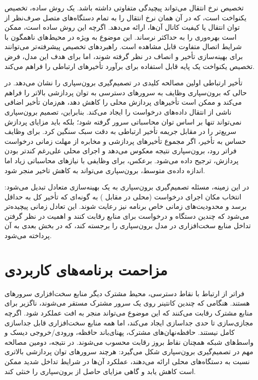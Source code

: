 تخصیص نرخ انتقال می‌تواند پیچیدگی متفاوتی داشته باشد. یک روش ساده، تخصیص یکنواخت است، که در آن  همان نرخ انتقال را به تمام دستگاه‌های متصل صرف‌نظر از توان انتقال یا کیفیت کانال آن‌ها، ارائه می‌دهد. اگرچه این روش ساده است، ممکن است بهره‌وری را به حداکثر نرساند. این موضوع به ویژه در محیط‌های ناهمگون با شرایط اتصال متفاوت قابل مشاهده است. راهبردهای تخصیص پیشرفته‌تر می‌توانند برای بهینه‌سازی تأخیر و انصاف در نظر گرفته شوند، اما برای هدف این مدل، فرض تخصیص یکنواخت یک پایه قابل استفاده برای برآورد تأخیرهای ارتباطی را فراهم می‌کند.

تأخیر ارتباطی اولین مصالحه کلیدی در تصمیم‌گیری برون‌سپاری را نشان می‌دهد. در حالی که برون‌سپاری وظایف به سرورهای  دسترسی به توان پردازشی بالاتر را فراهم می‌کند و ممکن است تأخیرهای پردازش محلی را کاهش دهد، هم‌زمان تأخیر اضافی ناشی از انتقال ‌داده‌های درخواست را ایجاد می‌کند. بنابراین، تصمیم برون‌سپاری نمی‌تواند تنها بر اساس توان محاسباتی سرور  گرفته شود؛ بلکه باید مزایای پردازش سریع‌تر را در مقابل جریمه‌ تأخیر ارتباطی به دقت سبک سنگین کرد. برای وظایف حساس به تأخیر، اگر مجموع تأخیرهای پردازشی و مخابره از مهلت زمانی درخواست فراتر رود، برون‌سپاری نتیجه معکوس می‌دهد و اجرای محلی علی‌رغم کندتر بودن پردازش، ترجیح داده می‌شود. برعکس، برای وظایفی با نیازهای محاسباتی زیاد اما اندازه داده‌ی متوسط، برون‌سپاری می‌تواند به کاهش تاخیر منجر شود.

در این زمینه، مسئله تصمیم‌گیری برون‌سپاری به یک بهینه‌سازی متعادل تبدیل می‌شود: انتخاب مکان اجرای درخواست (محلی در مقابل ) به گونه‌ای که تأخیر کل به حداقل برسد و محدودیت‌های زمانی خاص برنامه نیز رعایت شوند. این تعادل زمانی پیچیده‌تر می‌شود که چندین دستگاه و درخواست برای منابع  رقابت کنند و اهمیت در نظر گرفتن تداخل منابع سخت‌افزاری در مدل برون‌سپاری را برجسته کند، که در بخش‌ بعدی به آن پرداخته می‌شود.

\section{مزاحمت برنامه‌های کاربردی}
\label{subsec:interference_model}

فراتر از ارتباط با نقاط دسترسی، محیط مشترک دیگر منابع سخت‌افزاری سرورهای  هستند. هنگامی که چندین کانتینر روی یک سرور مشترک مستقر می‌شوند، ناگزیر برای منابع مشترک رقابت می‌کنند که این موضوع می‌تواند منجر به افت عملکرد شود. اگرچه مجازی‌سازی تا حدی جداسازی ایجاد می‌کند، اما همه منابع سخت‌افزاری قابل جداسازی کامل نیستند. حافظه‌نهان‌های مشترک، پهنای‌باند حافظه، ورودی/خروجی دیسک و واسط‌های شبکه همچنان نقاط بروز رقابت محسوب می‌شوند. در نتیجه، دومین مصالحه مهم در تصمیم‌گیری برون‌سپاری شکل می‌گیرد: هرچند سرورهای  توان پردازشی بالاتری نسبت به دستگاه‌های محلی ارائه می‌دهند، عملکرد آن‌ها در شرایط تداخل شدید ممکن است کاهش یابد و گاهی مزایای حاصل از برون‌سپاری را خنثی کند.

